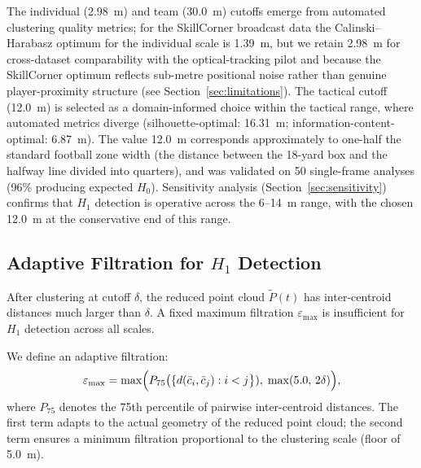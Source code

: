 The individual (2.98~m) and team (30.0~m) cutoffs emerge from automated clustering quality metrics; for the SkillCorner broadcast data the Calinski--Harabasz optimum for the individual scale is 1.39~m, but we retain 2.98~m for cross-dataset comparability with the optical-tracking pilot and because the SkillCorner optimum reflects sub-metre positional noise rather than genuine player-proximity structure (see Section~\ref{sec:limitations}). The tactical cutoff (12.0~m) is selected as a domain-informed choice within the tactical range, where automated metrics diverge (silhouette-optimal: 16.31~m; information-content-optimal: 6.87~m). The value 12.0~m corresponds approximately to one-half the standard football zone width (the distance between the 18-yard box and the halfway line divided into quarters), and was validated on 50 single-frame analyses (96\% producing expected \(H_0\)). Sensitivity analysis (Section~\ref{sec:sensitivity}) confirms that \(H_1\) detection is operative across the 6--14~m range, with the chosen 12.0~m at the conservative end of this range.

\subsection{Adaptive Filtration for \texorpdfstring{$H_1$}{H1} Detection}
\label{sec:adaptive}

After clustering at cutoff \(\delta\), the reduced point cloud \(\tilde P(t)\) has inter-centroid distances much larger than \(\delta\). A fixed maximum filtration \(\varepsilon_{\max}\) is insufficient for \(H_1\) detection across all scales.

We define an adaptive filtration:
\begin{equation}
  \varepsilon_{\max}=\max\Bigl(
    P_{75}\bigl(\{d(\bar c_i,\bar c_j): i<j\bigr\}),\;
    \max(5.0,\,2\delta)
  \Bigr), \label{eq:adaptive}
\end{equation}
where \(P_{75}\) denotes the 75th percentile of pairwise inter-centroid distances. The first term adapts to the actual geometry of the reduced point cloud; the second term ensures a minimum filtration proportional to the clustering scale (floor of 5.0~m).

